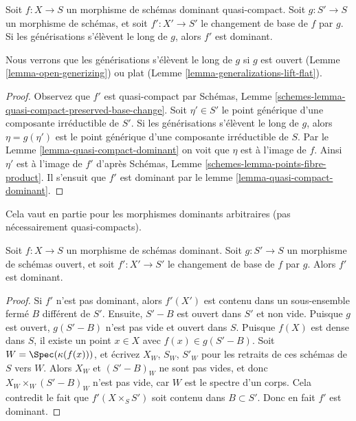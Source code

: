 \begin{lemma}
\label{lemma-base-change-dominant}
Soit $f : X \to S$ un morphisme de schémas dominant quasi-compact. Soit $g : S' \to S$
un morphisme de schémas, et soit $f' : X' \to S'$ le changement de base de $f$
par $g$. Si les générisations s'élèvent le long de $g$, alors
$f'$ est dominant.
\end{lemma}

\noindent
Nous verrons que les générisations s'élèvent le long de $g$
si $g$ est ouvert
(Lemme \ref{lemma-open-generizing}) ou plat (Lemme \ref{lemma-generalizations-lift-flat}).

\begin{proof}
Observez que $f'$ est quasi-compact par Schémas,
Lemme \ref{schemes-lemma-quasi-compact-preserved-base-change}. Soit $\eta' \in S'$ le point générique
d'une composante irréductible de $S'$.
Si les générisations s'élèvent le long de $g$,
alors $\eta = g(\eta')$ est le point générique d'une composante
irréductible de $S$. Par le Lemme \ref{lemma-quasi-compact-dominant}
on voit que $\eta$ est à l'image de
$f$. Ainsi $\eta'$ est à
l'image de $f'$ d'après Schémas, Lemme \ref{schemes-lemma-points-fibre-product}.
Il s'ensuit que $f'$ est dominant par le lemme \ref{lemma-quasi-compact-dominant}.
\end{proof}

\noindent
Cela vaut en partie pour les morphismes dominants arbitraires (pas nécessairement
quasi-compacts).

\begin{lemma}
\label{lemma-open-base-change-dominant}
Soit $f : X \to S$ un morphisme de schémas dominant. Soit $g : S' \to S$
un morphisme de schémas ouvert, et soit $f' : X' \to S'$ le changement de base
de $f$ par $g$. Alors $f'$ est dominant.
\end{lemma}

\begin{proof}
Si $f'$ n'est pas dominant, alors $f'(X')$ est contenu dans un sous-ensemble
fermé $B$ différent de $S'$. Ensuite, $S'-B$ est ouvert dans $S'$
et non vide. Puisque $g$ est ouvert, $g(S'-B)$ n'est pas vide et ouvert
dans $S$. Puisque $f(X)$ est dense dans $S$, il existe un
point $x\in X$ avec $f(x) \in g(S'-B)$. Soit
$W = \Spec(\kappa (f(x)))$, et écrivez $X_W$, $S_W$, $S'_W$
pour les retraits de ces schémas de $S$ vers $W$. Alors $X_W$ et
$(S'-B)_W$ ne sont pas vides, et donc $X_W \times_W (S'-B)_W$ n'est pas vide, car $W$
est le spectre d'un corps. Cela contredit le fait que $f'(X \times_S S')$ soit contenu
dans $B \subset S'$. Donc en fait $f'$ est dominant.
\end{proof}

